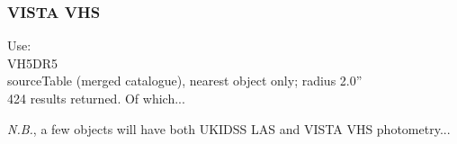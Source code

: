\documentclass[usenatbib]{mnras}
\begin{document}
\subsubsection{VISTA VHS} 
Use:\\
VH5DR5 \\
sourceTable (merged catalogue), nearest object only; radius 2.0'' \\
424 results returned.  Of which...

{\it N.B.}, a few objects will have both UKIDSS LAS and VISTA VHS photometry...


\iffalse
\subsection{Filter and Survey choices} 
We make some choices when reporting our archival photometry. 
This includes:
\begin{itemize}
\item Report Pan-STARRS1 DR1 $grizy$ wherever we have it; 
\item Report WFCAM $YJHK$ (mainly from the UKIDSS); 
\item Report VIRCAM $YJHK_{\rm S}$ (mainly from the VISTA surveys); 
\item Report VIRCAM $YJH$ over WFCAM  $YJH$; 
\item Report both VIRCAM $K_{\rm S}$ and WFCAM  $K$; 
\item Report DECam $grz$ wherever we have it (mainly from the DES and DECaLS); 
\item Due to lack of coverage, do not report WFCAM $Z$-band. 
\end{itemize}
\fi




    

\end{document}
